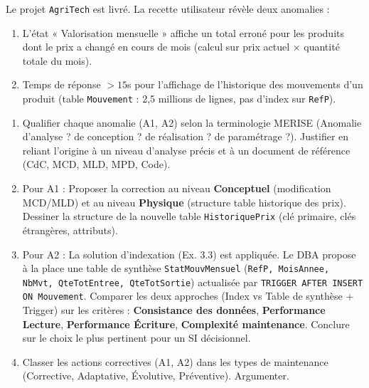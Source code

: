 \documentclass[11pt]{article}
\begin{document}
\begin{exercice}
Le projet \texttt{AgriTech} est livré. La recette utilisateur révèle deux anomalies : 
\begin{enumerate}
    \item[A1] L'état « Valorisation mensuelle » affiche un total erroné pour les produits dont le prix a changé en cours de mois (calcul sur prix actuel $\times$ quantité totale du mois).
    \item[A2] Temps de réponse $> 15$s pour l'affichage de l'historique des mouvements d'un produit (table \texttt{Mouvement} : 2,5 millions de lignes, pas d'index sur \texttt{RefP}).
\end{enumerate}
\begin{enumerate}
    \item Qualifier chaque anomalie (A1, A2) selon la terminologie MERISE (Anomalie d'analyse ? de conception ? de réalisation ? de paramétrage ?). Justifier en reliant l'origine à un niveau d'analyse précis et à un document de référence (CdC, MCD, MLD, MPD, Code).
    \item Pour A1 : Proposer la correction au niveau \textbf{Conceptuel} (modification MCD/MLD) et au niveau \textbf{Physique} (structure table historique des prix). Dessiner la structure de la nouvelle table \texttt{HistoriquePrix} (clé primaire, clés étrangères, attributs).
    \item Pour A2 : La solution d'indexation (Ex. 3.3) est appliquée. Le DBA propose à la place une table de synthèse \texttt{StatMouvMensuel} (\texttt{RefP, MoisAnnee, NbMvt, QteTotEntree, QteTotSortie}) actualisée par \texttt{TRIGGER AFTER INSERT ON Mouvement}. Comparer les deux approches (Index vs Table de synthèse + Trigger) sur les critères : \textbf{Consistance des données}, \textbf{Performance Lecture}, \textbf{Performance Écriture}, \textbf{Complexité maintenance}. Conclure sur le choix le plus pertinent pour un SI décisionnel.
    \item Classer les actions correctives (A1, A2) dans les types de maintenance (Corrective, Adaptative, Évolutive, Préventive). Argumenter.
\end{enumerate}
\end{exercice}
\end{document}
